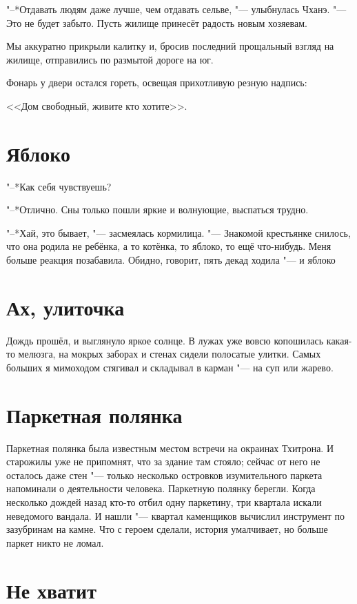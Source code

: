 \documentclass[a4paper,10pt,fleqn]{book}
\newcommand{\ldotst}{\so{...}\xspace}
\begin{document}
"--*Отдавать людям даже лучше, чем отдавать сельве, "--- улыбнулась Чханэ.
"--- Это не будет забыто.
Пусть жилище принесёт радость новым хозяевам.

Мы аккуратно прикрыли калитку и, бросив последний прощальный взгляд на жилище, отправились по размытой дороге на юг.

Фонарь у двери остался гореть, освещая прихотливую резную надпись:

<<Дом свободный, живите кто хотите>>.

\section{Яблоко}

"--*Как себя чувствуешь?

"--*Отлично.
Сны только пошли яркие и волнующие, выспаться трудно.

"--*Хай, это бывает, "--- засмеялась кормилица.
"--- Знакомой крестьянке снилось, что она родила не ребёнка, а то котёнка, то яблоко, то ещё что-нибудь.
Меня больше реакция позабавила.
Обидно, говорит, пять декад ходила "--- и яблоко\ldotst

\section{Ах, улиточка}

Дождь прошёл, и выглянуло яркое солнце.
В лужах уже вовсю копошилась какая-то мелюзга, на мокрых заборах и стенах сидели полосатые улитки.
Самых больших я мимоходом стягивал и складывал в карман "--- на суп или жарево.

\section{Паркетная полянка}

Паркетная полянка была известным местом встречи на окраинах Тхитрона.
И старожилы уже не припомнят, что за здание там стояло;
сейчас от него не осталось даже стен "--- только несколько островков изумительного паркета напоминали о деятельности человека.
Паркетную полянку берегли.
Когда несколько дождей назад кто-то отбил одну паркетину, три квартала искали неведомого вандала.
И нашли "--- квартал каменщиков вычислил инструмент по зазубринам на камне.
Что с героем сделали, история умалчивает, но больше паркет никто не ломал.

\section{Не хватит}
\end{document}
